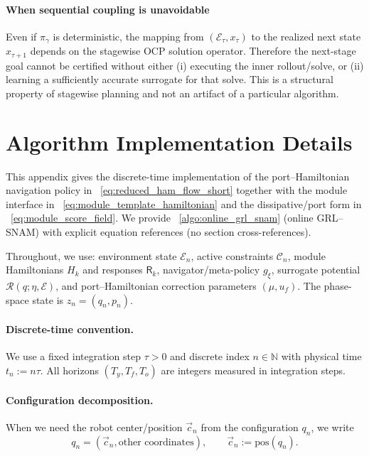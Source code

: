 \paragraph{When sequential coupling is unavoidable}
\label{rem:sequential_unavoidable}
Even if $\pi_\gamma$ is deterministic, the mapping from $(\mathcal E_\tau,x_\tau)$ to the realized next state $x_{\tau+1}$
depends on the stagewise OCP solution operator. Therefore the next-stage goal cannot be certified without either
(i) executing the inner rollout/solve, or (ii) learning a sufficiently accurate surrogate for that solve.
This is a structural property of stagewise planning and not an artifact of a particular algorithm.


\section{Algorithm Implementation Details}
\label{app:algorithm_details}

This appendix gives the discrete-time implementation of the port--Hamiltonian navigation policy in
~\cref{eq:reduced_ham_flow_short} together with the module interface in
~\cref{eq:module_template_hamiltonian} and the dissipative/port form in
~\cref{eq:module_score_field}. We provide ~\cref{algo:online_grl_snam} (online GRL--SNAM)
with explicit equation references (no section cross-references).

Throughout, we use: environment state $\mathcal{E}_n$, active constraints $\mathcal{C}_n$, module
Hamiltonians $H_k$ and responses $\mathsf{R}_k$, navigator/meta-policy $g_\xi$, surrogate potential
$\mathcal{R}(q;\eta,\mathcal{E})$, and port--Hamiltonian correction parameters
$(\mu, u_f)$. The phase-space state is $z_n=(q_n,p_n)$.

\paragraph{Discrete-time convention.}
We use a fixed integration step $\tau>0$ and discrete index $n\in\mathbb{N}$ with physical time
$t_n := n\tau$. All horizons $(T_y,T_f,T_o)$ are integers measured in integration steps.

\paragraph{Configuration decomposition.}
When we need the robot center/position $\vec c_n$ from the configuration $q_n$, we write
\begin{equation}
\label{eq:impl:config_decomp}
q_n = (\vec c_n, \text{other coordinates}),\qquad \vec c_n := \mathrm{pos}(q_n).
\end{equation}

